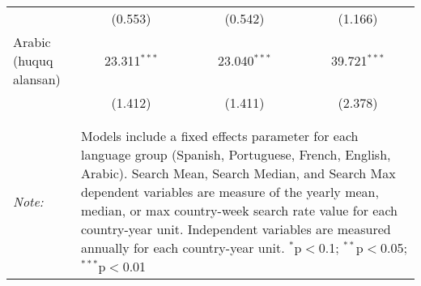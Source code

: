 \begin{table}[!htbp]
\begin{tabular}{@{\extracolsep{5pt}}lccc}
  & (0.553) & (0.542) & (1.166) \\ 
  Arabic (huquq alansan) & 23.311$^{***}$ & 23.040$^{***}$ & 39.721$^{***}$ \\ 
  & (1.412) & (1.411) & (2.378) \\ 
 \hline \\[-1.8ex] 
\hline 
\hline \\[-1.8ex] 
\textit{Note:}  & \multicolumn{3}{l}{\parbox[t]{8cm}{Models include a fixed effects parameter for each language group (Spanish, Portuguese, French, English, Arabic). Search Mean, Search Median, and Search Max dependent variables are measure of the yearly mean, median, or max country-week search rate value for each country-year unit. Independent variables are measured annually for each country-year unit. $^{*}$p$<$0.1; $^{**}$p$<$0.05; $^{***}$p$<$0.01}} \\ 
\end{tabular} 
\end{table} 
